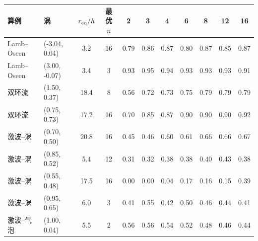 \begin{tabular}{llccccccccc}\toprule 算例 & 涡 & $r_{\rm eq}/h$ & 最优 $n$ & 2 & 3 & 4 & 6 & 8 & 12 & 16\\\midrule
Lamb–Oseen & (-3.04, 0.04) & 3.2 & 16 & 0.79 & 0.86 & 0.87 & 0.80 & 0.87 & 0.85 & 0.87\\
Lamb–Oseen & (3.00, -0.07) & 3.4 & 3 & 0.93 & 0.95 & 0.94 & 0.93 & 0.93 & 0.93 & 0.91\\
双环流 & (1.50, 0.37) & 18.4 & 8 & 0.56 & 0.72 & 0.73 & 0.75 & 0.79 & 0.79 & 0.79\\
双环流 & (0.75, 0.73) & 17.2 & 16 & 0.70 & 0.85 & 0.87 & 0.90 & 0.90 & 0.90 & 0.92\\
激波–涡 & (0.70, 0.50) & 20.8 & 16 & 0.45 & 0.46 & 0.60 & 0.61 & 0.66 & 0.66 & 0.67\\
激波–涡 & (0.85, 0.52) & 5.4 & 12 & 0.31 & 0.32 & 0.38 & 0.38 & 0.40 & 0.43 & 0.38\\
激波–涡 & (0.55, 0.48) & 17.5 & 16 & 0.00 & 0.00 & 0.04 & 0.17 & 0.16 & 0.15 & 0.39\\
激波–涡 & (0.95, 0.65) & 6.0 & 3 & 0.41 & 0.55 & 0.42 & 0.50 & 0.46 & 0.44 & 0.41\\
激波–气泡 & (1.00, 0.04) & 5.5 & 2 & 0.56 & 0.56 & 0.54 & 0.52 & 0.48 & 0.46 & 0.44\\
\bottomrule\end{tabular}